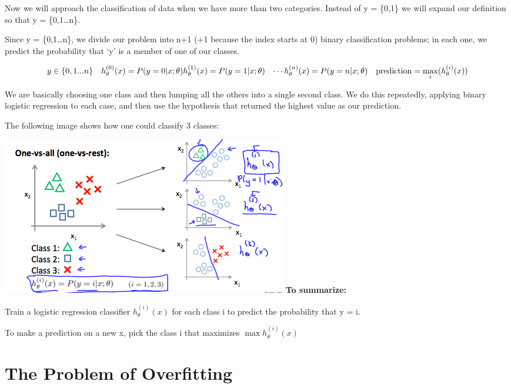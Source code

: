 \documentclass[
]{book}
\begin{document}
Now we will approach the classification of data when we have more than two categories. Instead of y = \{0,1\} we will expand our definition so that y = \{0,1\ldots n\}.

Since y = \{0,1\ldots n\}, we divide our problem into n+1 (+1 because the index starts at 0) binary classification problems; in each one, we predict the probability that `y' is a member of one of our classes.

\begin{align}& y \in \lbrace0, 1 ... n\rbrace \newline& h_\theta^{(0)}(x) = P(y = 0 | x ; \theta) \newline& h_\theta^{(1)}(x) = P(y = 1 | x ; \theta) \newline& \cdots \newline& h_\theta^{(n)}(x) = P(y = n | x ; \theta) \newline& \mathrm{prediction} = \max_i( h_\theta ^{(i)}(x) )\newline\end{align}

We are basically choosing one class and then lumping all the others into a single second class. We do this repeatedly, applying binary logistic regression to each case, and then use the hypothesis that returned the highest value as our prediction.

The following image shows how one could classify 3 classes:

\includegraphics{multi_class_logreg.png}
\textbf{To summarize:}

Train a logistic regression classifier \(h_\theta^{(i)}(x)\) for each class i to predict the probability that y = i.

To make a prediction on a new x, pick the class i that maximizes \(\max h_\theta^{(i)} (x)\)

\hypertarget{the-problem-of-overfitting}{%
\section{The Problem of Overfitting}\label{the-problem-of-overfitting}}
\end{document}
